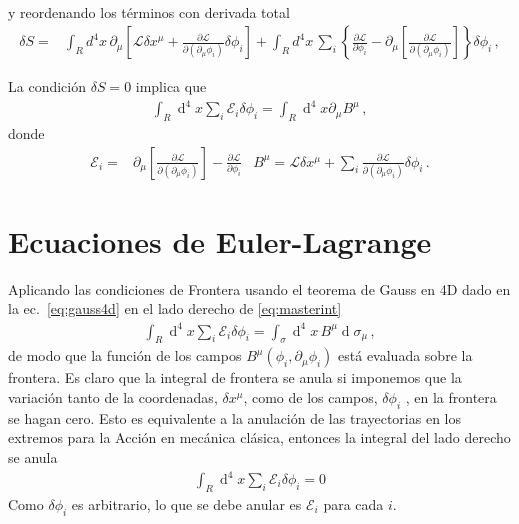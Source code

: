 \begin{frame}
\begin{align}
\end{align}
y reordenando los términos con derivada total
\begin{align}
  \delta S =&
\int_{R} d^4x\,\partial_{\mu} \left[\mathcal{L} \delta x^{\mu} + \frac{\partial\mathcal{L}}{\partial(\partial_{\mu}\phi_i)}\delta\phi_{i} \right]  + \int_{R}d^4x\,\sum_i \left\{ \frac{\partial\mathcal{L}}{\partial\phi_i} -\partial_{\mu} \left[ \frac{\partial\mathcal{L}}{\partial(\partial_{\mu}\phi_i)}\right]  \right\}\delta\phi_{i}\,,              
\end{align}
\end{frame}

\begin{frame}
La condición $\delta S=0$ implica que
\begin{align}
\label{eq:masterint}
\int_R \operatorname{d}^4x  \sum_i \mathcal{E}_i \delta\phi_i =\int_R \operatorname{d}^4x  \partial_{\mu} B^{\mu}\,,
\end{align}
donde
\begin{align}
\label{eq:master2}
  \mathcal{E}_i=&\partial_{\mu} \left[ \frac{\partial\mathcal{L}}{\partial(\partial_{\mu}\phi_i)}\right]-\frac{\partial\mathcal{L}}{\partial\phi_i} & B^{\mu}=\mathcal{L} \delta x^{\mu} +\sum_i \frac{\partial\mathcal{L}}{\partial(\partial_{\mu}\phi_i)}\delta\phi_{i}\,. 
\end{align}
\end{frame}


\section{Ecuaciones de Euler-Lagrange}


Aplicando las condiciones de Frontera usando  el teorema de Gauss en 4D dado en la ec.~\eqref{eq:gauss4d} en el lado derecho de \eqref{eq:masterint}
\begin{align}
\int_R \operatorname{d}^4x  \sum_i \mathcal{E}_i \delta\phi_i =\int_\sigma \operatorname{d}^4x \, B^{\mu}\operatorname{d}\sigma_{\mu}\,,
\end{align}
de modo que la función de los campos $B^{\mu}(\phi_i,\partial_{\mu} \phi_{i})$ está evaluada sobre la frontera.
Es claro que la integral de frontera se anula si imponemos que la variación tanto de la coordenadas, $\delta x^{\mu}$, como de los campos, $\delta \phi_{i}$ , en la frontera se hagan cero. Esto es equivalente a la anulación de las trayectorias en los extremos para la Acción en mecánica clásica, 
entonces la integral del lado derecho se anula 
\begin{align}
\int_R \operatorname{d}^4x  \sum_i \mathcal{E}_i \delta\phi_i =0
\end{align}
Como $\delta\phi_i$ es arbitrario, lo que se debe anular es $\mathcal{E}_i$ para cada $i$.

